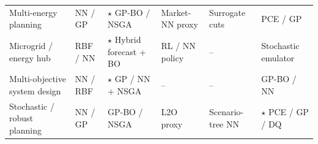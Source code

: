\begin{table}[!t]
\begin{tabularx}{\textwidth}{@{}L{0.16\textwidth} L{0.18\textwidth} L{0.16\textwidth} L{0.16\textwidth} L{0.14\textwidth} L{0.14\textwidth}@{}}
    Multi-energy planning
      & NN / GP \cite{Zheng20231907,Yin2024,Ren2024}
      & $\star$ GP-BO / NSGA \cite{Han2018622,Roth2019214,Schulte2020}
      & Market-NN proxy \cite{Jalving2023,Wang2020202933}
      & Surrogate cuts \cite{Ghosh2023,Shi2024__2}
      & PCE / GP \cite{Dong2023,Dong2022,Wang2024} \\
    Microgrid / energy hub
      & RBF / NN \cite{Wang2017,Hussien20211883,Roth2019214}
      & $\star$ Hybrid forecast + BO \cite{Eseye201991463,Faraji2020157284,Nematollahi2021,Wang20192635}
      & RL / NN policy \cite{Chaturvedi2024149,Hussien20226442,Prusty2025}
      & --
      & Stochastic emulator \cite{Liang20222192,Cao2023,Khalid20241959} \\
    Multi-objective system design
      & NN / RBF \cite{Hirvonen2017323,Wang2017,Schulte2020}
      & $\star$ GP / NN + NSGA \cite{Roth2019214,Han2018622,Hussien20211883,Zang2023813,Reis2025,Katkar2025}
      & --
      & --
      & GP-BO / NN \cite{Aghaei Pour2022303,Chakrabarty2021} \\
    Stochastic / robust planning
      & NN / GP \cite{Lawson201647,Liu20222679,Hu2020}
      & GP-BO / NSGA \cite{Lin2023,Pang2023}
      & L2O proxy \cite{Liang20246508}
      & Scenario-tree NN \cite{Han2024,Zhang2024821}
      & $\star$ PCE / GP / DQ \cite{Muhlpfordt20194806,Safta20172535,Lu201991827,Yang2024__2,Volodina2022} \\
    \bottomrule
  \end{tabularx}
\end{table}
